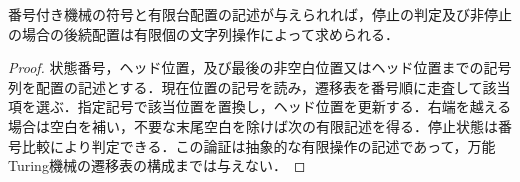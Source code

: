 \begin{prop}[有限記述による一段の模擬]
番号付き機械の符号と有限台配置の記述が与えられれば，停止の判定及び非停止の場合の後続配置は有限個の文字列操作によって求められる．
\end{prop}
\begin{proof}
状態番号，ヘッド位置，及び最後の非空白位置又はヘッド位置までの記号列を配置の記述とする．現在位置の記号を読み，遷移表を番号順に走査して該当項を選ぶ．指定記号で該当位置を置換し，ヘッド位置を更新する．右端を越える場合は空白を補い，不要な末尾空白を除けば次の有限記述を得る．停止状態は番号比較により判定できる．この論証は抽象的な有限操作の記述であって，万能Turing機械の遷移表の構成までは与えない．
\end{proof}
